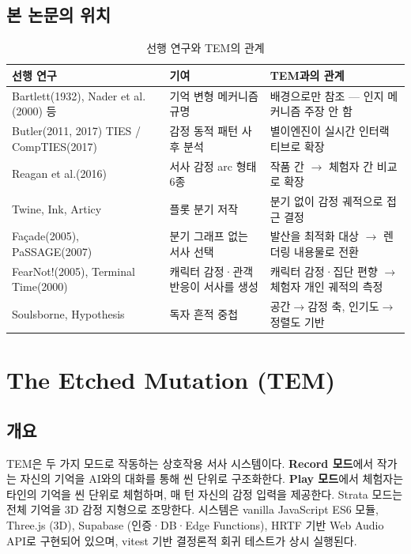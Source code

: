 \documentclass[11pt, a4paper]{article}
\begin{document}
\subsection{본 논문의 위치}

\begin{table}[H]
\centering
\caption{선행 연구와 TEM의 관계}
\small
\begin{tabular}{p{4.6cm} p{4.0cm} p{5.2cm}}
\toprule
\textbf{선행 연구} & \textbf{기여} & \textbf{TEM과의 관계} \\
\midrule
Bartlett(1932), Nader et al.(2000) 등 & 기억 변형 메커니즘 규명 & 배경으로만 참조 --- 인지 메커니즘 주장 안 함 \\
Butler(2011, 2017) TIES / CompTIES(2017) & 감정 동적 패턴 사후 분석 & 별이엔진이 실시간 인터랙티브로 확장 \\
Reagan et al.(2016) & 서사 감정 arc 형태 6종 & 작품 간 $\rightarrow$ 체험자 간 비교로 확장 \\
Twine, Ink, Articy & 플롯 분기 저작 & 분기 없이 감정 궤적으로 접근 결정 \\
Façade(2005), PaSSAGE(2007) & 분기 그래프 없는 서사 선택 & 발산을 최적화 대상 $\rightarrow$ 렌더링 내용물로 전환 \\
FearNot!(2005), Terminal Time(2000) & 캐릭터 감정·관객 반응이 서사를 생성 & 캐릭터 감정·집단 편향 $\rightarrow$ 체험자 개인 궤적의 측정 \\
Soulsborne, Hypothesis & 독자 흔적 중첩 & 공간$\rightarrow$감정 축, 인기도$\rightarrow$정렬도 기반 \\
\bottomrule
\end{tabular}
\end{table}

\section{The Etched Mutation (TEM)}

\subsection{개요}

TEM은 두 가지 모드로 작동하는 상호작용 서사 시스템이다. \textbf{Record 모드}에서 작가는 자신의 기억을 AI와의 대화를 통해 씬 단위로 구조화한다. \textbf{Play 모드}에서 체험자는 타인의 기억을 씬 단위로 체험하며, 매 턴 자신의 감정 입력을 제공한다. Strata 모드는 전체 기억을 3D 감정 지형으로 조망한다. 시스템은 vanilla JavaScript ES6 모듈, Three.js (3D), Supabase (인증·DB·Edge Functions), HRTF 기반 Web Audio API로 구현되어 있으며, vitest 기반 결정론적 회귀 테스트가 상시 실행된다.
\end{document}

